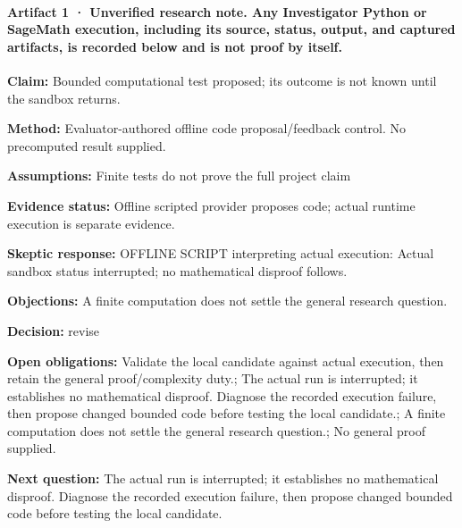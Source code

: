 \documentclass[11pt]{article}
\begin{document}
\paragraph{Artifact 1 · Unverified research note. Any Investigator Python or SageMath execution, including its source, status, output, and captured artifacts, is recorded below and is not proof by itself.}
\textbf{Claim:} Bounded computational test proposed; its outcome is not known until the sandbox returns.\par
\textbf{Method:} Evaluator-authored offline code proposal/feedback control. No precomputed result supplied.\par
\textbf{Assumptions:} Finite tests do not prove the full project claim\par
\textbf{Evidence status:} Offline scripted provider proposes code; actual runtime execution is separate evidence.\par
\textbf{Skeptic response:} OFFLINE SCRIPT interpreting actual execution: Actual sandbox status interrupted; no mathematical disproof follows.\par
\textbf{Objections:} A finite computation does not settle the general research question.\par
\textbf{Decision:} revise\par
\textbf{Open obligations:} Validate the local candidate against actual execution, then retain the general proof/complexity duty.; The actual run is interrupted; it establishes no mathematical disproof. Diagnose the recorded execution failure, then propose changed bounded code before testing the local candidate.; A finite computation does not settle the general research question.; No general proof supplied.\par
\textbf{Next question:} The actual run is interrupted; it establishes no mathematical disproof. Diagnose the recorded execution failure, then propose changed bounded code before testing the local candidate.\par
\end{document}
